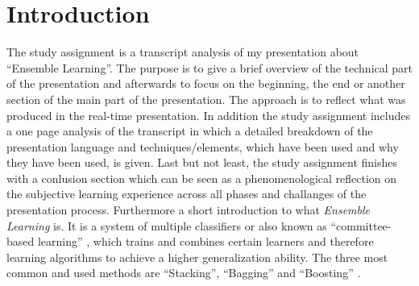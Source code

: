 \chapter{Introduction}

The study assignment is a transcript analysis of my presentation about \enquote{Ensemble Learning}. The purpose is  to give a brief overview of the technical part of the presentation and afterwards to focus on the beginning, the end or another section of the main part of the presentation. The approach is to reflect what was produced in the real-time presentation. In addition the study assignment includes a one page analysis of the transcript in which a detailed breakdown of the presentation language and techniques/elements, which have been used and why they have been used, is given. Last but not least, the study assignment finishes with a conlusion section which can be seen as a phenomenological reflection on the subjective learning experience across all phases and challanges of the presentation process. Furthermore a short introduction to what \textit{Ensemble Learning} is. It is a system of multiple classifiers or also known as \enquote{committee-based learning} \autocite[]{Zhou.2021}, which trains and combines certain learners and therefore learning algorithms to achieve a higher generalization ability. The three most common and used methods are \enquote{Stacking}, \enquote{Bagging} and \enquote{Boosting} \autocite[]{Zhou.2021} \autocite[]{Zhou.2012}.